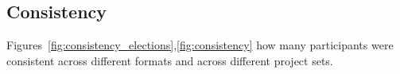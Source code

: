 \documentclass[letterpaper]{article} %
\newcommand{\kibitz}[2]{\ifnum\Comments=1{\color{#1}{#2}}\fi}
\newcommand{\rf}[1]{\kibitz{blue}{[Roy says:#1]}}
\newcommand{\gb}[1]{\kibitz{brown}{[GB:#1]}}
\begin{document}
\subsection{Consistency}
Figures~\ref{fig:consistency_elections},\ref{fig:consistency} how many participants were consistent across different formats and across different project sets.%

\end{document}
